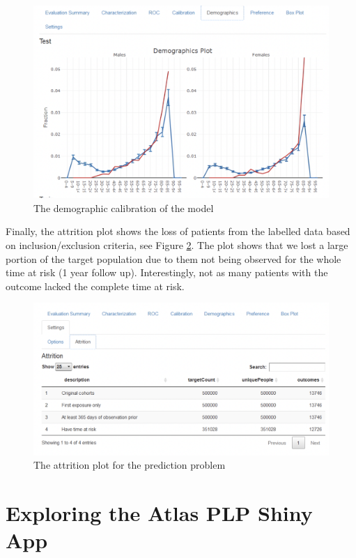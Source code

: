 \documentclass[11pt]{book}
\begin{document}
\begin{figure}

{\centering \includegraphics[width=0.8\linewidth]{images/PatientLevelPrediction/shiny/singleShiny/singleShinyDemo} 

}

\caption{The demographic calibration of the model}\label{fig:shinyDemo}
\end{figure}

Finally, the attrition plot shows the loss of patients from the labelled
data based on inclusion/exclusion criteria, see Figure
\ref{fig:shinyAtt}. The plot shows that we lost a large portion of the
target population due to them not being observed for the whole time at
risk (1 year follow up). Interestingly, not as many patients with the
outcome lacked the complete time at risk.

\begin{figure}

{\centering \includegraphics[width=0.8\linewidth]{images/PatientLevelPrediction/shiny/singleShiny/singleShinyAtt} 

}

\caption{The attrition plot for the prediction problem}\label{fig:shinyAtt}
\end{figure}

\section{Exploring the Atlas PLP Shiny
App}\label{exploring-the-atlas-plp-shiny-app}
\end{document}
